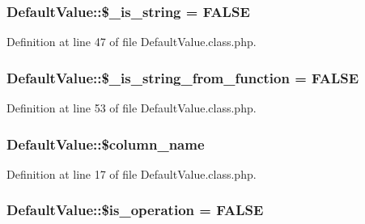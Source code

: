 \subsubsection[{\$\+\_\+is\+\_\+string}]{\setlength{\rightskip}{0pt plus 5cm}Default\+Value\+::\$\+\_\+is\+\_\+string = F\+A\+L\+S\+E}\label{classDefaultValue_ac3b23483d015be5b48517fb96890b64a}


Definition at line 47 of file Default\+Value.\+class.\+php.

\hypertarget{classDefaultValue_a000cf284b962d5c3354abd73b611c888}{}
\subsubsection[{\$\+\_\+is\+\_\+string\+\_\+from\+\_\+function}]{\setlength{\rightskip}{0pt plus 5cm}Default\+Value\+::\$\+\_\+is\+\_\+string\+\_\+from\+\_\+function = F\+A\+L\+S\+E}\label{classDefaultValue_a000cf284b962d5c3354abd73b611c888}


Definition at line 53 of file Default\+Value.\+class.\+php.

\hypertarget{classDefaultValue_a671e32e797e9975b6497a56a5ba92dc6}{}
\subsubsection[{\$column\+\_\+name}]{\setlength{\rightskip}{0pt plus 5cm}Default\+Value\+::\$column\+\_\+name}\label{classDefaultValue_a671e32e797e9975b6497a56a5ba92dc6}


Definition at line 17 of file Default\+Value.\+class.\+php.

\hypertarget{classDefaultValue_ae01855465814b8be26de7bd0b33b6778}{}
\subsubsection[{\$is\+\_\+operation}]{\setlength{\rightskip}{0pt plus 5cm}Default\+Value\+::\$is\+\_\+operation = F\+A\+L\+S\+E}\label{classDefaultValue_ae01855465814b8be26de7bd0b33b6778}



